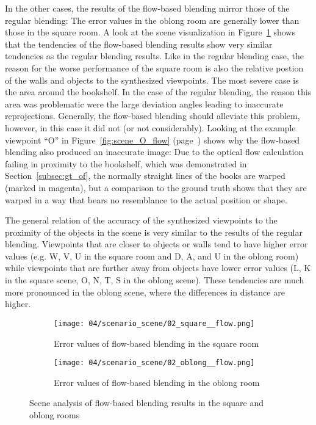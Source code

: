 In the other cases, the results of the flow-based blending mirror those of the regular blending: The error values in the oblong room are generally lower than those in the square room. A look at the scene visualization in Figure~\ref{fig:scene_flow_square_oblong} shows that the tendencies of the flow-based blending results show very similar tendencies as the regular blending results. 
Like in the regular blending case, the reason for the worse performance of the square room is also the relative postion of the walls and objects to the synthesized viewpoints.
The most severe case is the area around the bookshelf. In the case of the regular blending, the reason this area was problematic were the large deviation angles leading to inaccurate reprojections. Generally, the flow-based blending should alleviate this problem, however, in this case it did not (or not considerably). Looking at the example viewpoint ``O'' in Figure~\ref{fig:scene_O_flow} (page~\pageref{fig:scene_O_flow}) shows why the flow-based blending also produced an inaccurate image: 
Due to the optical flow calculation failing in proximity to the bookshelf, which was demonstrated in Section~\ref{subsec:gt_of}, the normally straight lines of the books are warped (marked in magenta), but a comparison to the ground truth shows that they are warped in a way that bears no resemblance to the actual position or shape.

The general relation of the accuracy of the synthesized viewpoints to the proximity of the objects in the scene is very similar to the results of the regular blending. Viewpoints that are closer to objects or walls tend to have higher error values (e.g. W, V, U in the square room and D, A, and U in the oblong room) while viewpoints that are further away from objects have lower error values (L, K in the square scene, O, N, T, S in the oblong scene). These tendencies are much more pronounced in the oblong scene, where the differences in distance are higher.

\begin{figure}
\centering
    \hfill
    \begin{subfigure}[b]{0.4\textwidth}
            \centering
            \texttt{[image: 04/scenario\_scene/02\_square\_\_flow.png]}
            \caption{Error values of flow-based blending in the square room}
    \end{subfigure}
    \hfill
    \begin{subfigure}[b]{0.4\textwidth}
            \centering
            \texttt{[image: 04/scenario\_scene/02\_oblong\_\_flow.png]}
            \caption{Error values of flow-based blending in the oblong room}
    \end{subfigure}
    \hfill
  \caption{Scene analysis of flow-based blending results in the square and oblong rooms} \label{fig:scene_flow_square_oblong}
\end{figure}




